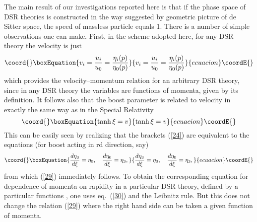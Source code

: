 \documentclass  [12pt] {article}
\begin{document}
The main result of our investigations reported here is that if the phase space
of DSR theories is constructed in the way suggested by geometric picture of de
Sitter space, the speed of massless particle equals 1. There is a number of
simple observations one can make. First, in the scheme adopted here, for any
DSR theory the velocity is just
\begin{equation}\coord{}\boxEquation{\label{28a}
v_i = \frac{u_i}{u_0} = \frac{\eta_i(p)}{\eta_0(p)}
}{v_i = \frac{u_i}{u_0} = \frac{\eta_i(p)}{\eta_0(p)}
}{ecuacion}\coordE{}\end{equation}
which provides the velocity--momentum relation for an arbitrary DSR theory,
since in any DSR theory the variables \myHighlight{$\eta_\mu$}\coordHE{} are functions of momenta,
given by its definition. It follows also that the boost parameter \myHighlight{$\xi$}\coordHE{} is
related to velocity in exactly the same way as in the Special Relativity
\begin{equation}\coord{}\boxEquation{\label{29}
 \tanh\xi = v
}{\tanh\xi = v
}{ecuacion}\coordE{}\end{equation}
This can be easily seen by realizing that the brackets (\ref{24}) are
equivalent to the equations (for boost acting in \coordHE{}rd direction, say)
\begin{equation}\coord{}\boxEquation{\label{30}
 \frac{d\eta_3}{d\xi} = \eta_0, \quad \frac{d\eta_0}{d\xi} = \eta_3,
}{\frac{d\eta_3}{d\xi} = \eta_0, \quad \frac{d\eta_0}{d\xi} = \eta_3,
}{ecuacion}\coordE{}\end{equation}
from which (\ref{29}) immediately follows. To obtain the corresponding equation
for  dependence of momenta \coordHE{} on rapidity in a particular DSR theory,
defined by a particular functions \coordHE{}, one uses eq.~(\ref{30}) and
the Leibnitz rule. But this does not change the relation (\ref{29}) where the
right hand side can be taken  a given function of momenta.
\newline
\end{document}
